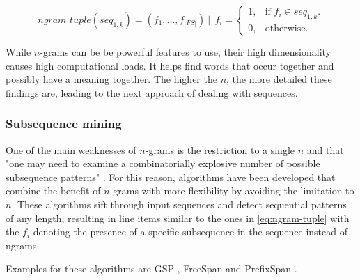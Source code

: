 \begin{equation}\label{eq:ngram-tuple}
    ngram\_tuple(seq_{1,k}) = (f_1, ..., f_{|FS|})\ |\ \ f_i = 
    \begin{cases}
    1, & \text{if $f_i \in seq_{1,k}$}.\\
    0, & \text{otherwise}.
    \end{cases}
\end{equation}

While $n$-grams can be be powerful features to use, their high dimensionality causes high computational loads. It helps find words that occur together and possibly have a meaning together. The higher the $n$, the more detailed these findings are, leading to the next approach of dealing with sequences.

\subsubsection*{Subsequence mining}
One of the main weaknesses of $n$-grams is the restriction to a single $n$ and that "one may need to examine a combinatorially explosive
number of possible subsequence patterns" \cite{pei2001prefixspan}. For this reason, algorithms have been developed that combine the benefit of $n$-grams with more flexibility by avoiding the limitation to $n$. These algorithms sift through input sequences and detect sequential patterns of any length, resulting in line items similar to the ones in \autoref{eq:ngram-tuple} with the $f_i$ denoting the presence of a specific subsequence in the sequence instead of ngrams.

Examples for these algorithms are GSP \cite{srikant1996gsp}, FreeSpan \cite{han2000freespan} and PrefixSpan \cite{pei2001prefixspan}.